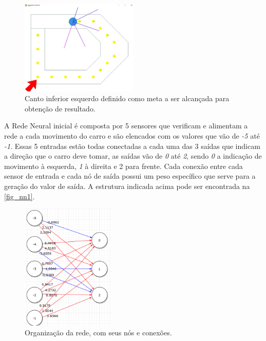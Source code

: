 \begin{figure}[htb]
        \centering
        \caption{\label{fig_meta}Canto inferior esquerdo definido como meta a ser alcançada para obtenção de resultado.}
        \includegraphics[width=0.5\textwidth]{images/meta.png}
\end{figure}

A Rede Neural inicial é composta por 5 sensores que verificam e alimentam a
rede a cada movimento do carro e são elencados com os valores que vão de \textit{-5} até
\textit{-1}. Essas 5 entradas estão todas conectadas a cada uma das 3 saídas que indicam
a direção que o carro deve tomar, as saídas vão de \textit{0} até \textit{2}, sendo \textit{0} a indicação
de movimento à esquerda, \textit{1} à direita e 2 para frente. Cada conexão entre cada
sensor de entrada e cada nó de saída possui um peso específico que serve para a
geração do valor de saída. A estrutura indicada acima pode ser encontrada na
\autoref{fig_nn1}.

\begin{figure}[htb]
        \centering
        \caption{\label{fig_nn1}Organização da rede, com seus nós e conexões.}
        \includegraphics[width=0.4\textwidth]{images/nn1.png}
\end{figure}

